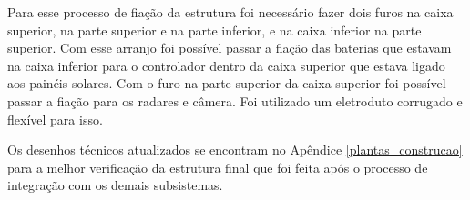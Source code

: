 Para esse processo de fiação da estrutura foi necessário fazer dois furos na caixa superior, na parte superior e na parte inferior, e na caixa inferior na parte superior. Com esse arranjo foi possível passar a fiação das baterias que estavam na caixa inferior para o controlador dentro da caixa superior que estava ligado aos painéis solares. Com o furo na parte superior da caixa superior foi possível passar a fiação para os radares e câmera. Foi utilizado um eletroduto corrugado e flexível para isso.

Os desenhos técnicos atualizados se encontram no Apêndice \ref{plantas_construcao} para a melhor verificação da estrutura final que foi feita após o processo de integração com os demais subsistemas.
